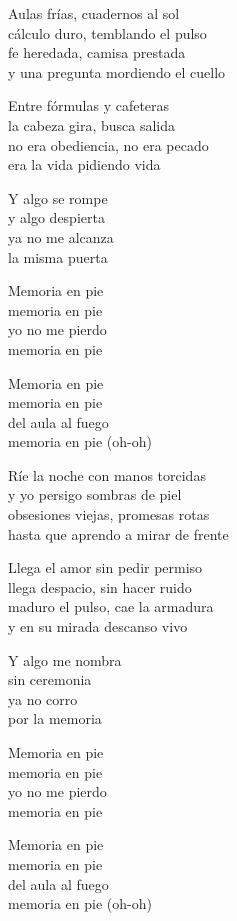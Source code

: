 \begin{lyrics}
Aulas frías, cuadernos al sol\\
cálculo duro, temblando el pulso\\
fe heredada, camisa prestada\\
y una pregunta mordiendo el cuello

Entre fórmulas y cafeteras\\
la cabeza gira, busca salida\\
no era obediencia, no era pecado\\
era la vida pidiendo vida

Y algo se rompe\\
y algo despierta\\
ya no me alcanza\\
la misma puerta

Memoria en pie\\
memoria en pie\\
yo no me pierdo\\
memoria en pie

Memoria en pie\\
memoria en pie\\
del aula al fuego\\
memoria en pie
(oh-oh)

Ríe la noche con manos torcidas\\
y yo persigo sombras de piel\\
obsesiones viejas, promesas rotas\\
hasta que aprendo a mirar de frente

Llega el amor sin pedir permiso\\
llega despacio, sin hacer ruido\\
maduro el pulso, cae la armadura\\
y en su mirada descanso vivo

Y algo me nombra\\
sin ceremonia\\
ya no corro\\
por la memoria

Memoria en pie\\
memoria en pie\\
yo no me pierdo\\
memoria en pie

Memoria en pie\\
memoria en pie\\
del aula al fuego\\
memoria en pie
(oh-oh)


\end{lyrics}
